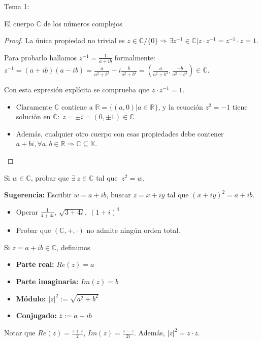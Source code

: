 \documentclass{article}
\newcommand{\C}{\mathbb{C}}
\newcommand{\R}{\mathbb{R}}
\newcommand{\CuerpoC}{(\C, +,\cdot)}
\begin{document}
\begin{section}{Tema 1:}
\begin{subsection}{El cuerpo $\mathbb{C}$ de los números complejos}
\begin{proof}
            La única propiedad no trivial es $z\in \C/\{0\}\Longrightarrow\exists z^{-1}\in\C | z\cdot z^{-1} = z^{-1}\cdot z = 1.$
            
            Para probarlo hallamos $z^{-1} = \frac{1}{a+ib}$ formalmente: $z^{-1} = (a+ib)(a-ib) = \frac{a}{a^2+b^2} -i\frac{b}{a^2+b^2} = (\frac{a}{a^2+b^2}, \frac{-b}{a^2+b^2})\in \C$.

            Con esta expresión explícita se comprueba que $z\cdot z^{-1} = 1$.
            \begin{itemize}
                \item Claramente $\C$ contiene a $\mathbb{R} = \{(a,0)|a\in \mathbb{R}\}$, y la ecuación $z^2 = -1$ tiene solución en $\C: \ z=\pm i=(0,\pm 1)\in\C$
                \item Además, cualquier otro cuerpo con esas propiedades debe contener $a+bi, \forall a,b \in \R \Rightarrow \C \subseteq \mathbb{K}$.
            \end{itemize}
        \end{proof}

        \begin{exercise}
            Si $w\in \C$, probar que $\exists \ z\in \C $ tal que $ \ z^2 = w$.
            
            \textbf{Sugerencia:} Escribir $w=a+ib$,  buscar $z=x+iy$ tal que $(x+iy)^2 = a+ib$.
        \end{exercise}
        \begin{exercise}\hfil
            \begin{itemize}
                \item Operar $\frac{1}{4+4i},\ \sqrt{3+4i}, \ (1+i)^4$
                \item Probar que $\CuerpoC$ no admite ningún orden total.
            \end{itemize}
        \end{exercise}
        \begin{definition}
            Si $z=a+ib \in \C$, definimos 
            \begin{itemize}
                \item \textbf{Parte real:} $Re(z)=a$
                \item \textbf{Parte imaginaria:} $Im(z) = b$
                \item \textbf{Módulo:} $|z|^2 := \sqrt{a^2+b^2}$
                \item \textbf{Conjugado:} $\overline{z}:= a-ib$
            \end{itemize}
            Notar que $Re(z) = \frac{z+\overline{z}}{2}$, $Im(z)=\frac{z-\overline{z}}{2i}$. Además, $|z|^2 = z\cdot \overline{z}$.


\end{definition}
\end{subsection}
\end{section}
\end{document}
